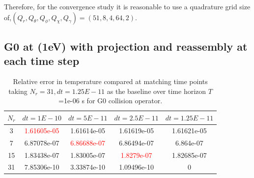 \documentclass{article}
\begin{document}
Therefore, for the convergence study it is reasonable to use a quadrature grid size of,$(Q_{r}, Q_{\theta}, Q_{\phi},Q_{\chi},Q_{\gamma}) =(51,8,4,64,2)$.

\subsection{G0 at (1eV) with projection and reassembly at each time step}
\begin{table}[H]
	\centering
	\begin{tabular}{|c|c|c|c|c|}
		\hline
		$N_r$ & $dt=1E-10$ & $dt=5E-11$ & $dt=2.5E-11$ & $dt=1.25E-11$\\
		\hline
		3   & \textcolor{red}{1.61605e-05} & 1.61614e-05  & 1.61619e-05  &  1.61621e-05 \\
		7   & 6.87078e-07 & \textcolor{red}{6.86688e-07}  &  6.86494e-07 &   6.864e-07 \\
		15  & 1.83438e-07 & 1.83005e-07  &  \textcolor{red}{1.8279e-07}  &  1.82685e-07 \\
		31  & 7.85306e-10 & 3.33874e-10  &  1.09496e-10 &   0 \\
		\hline
	\end{tabular}
	\caption{Relative error in temperature compared at matching time points taking $N_r=31,dt=1.25E-11$ as the baseline over time horizon $T$=1e-06 s for G0 collision operator. }
\end{table}
\end{document}
